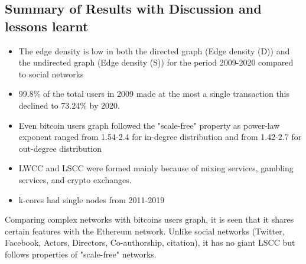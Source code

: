 \documentclass[preprint,12pt]{elsarticle}
\begin{document}
\subsection{Summary of Results with Discussion and lessons learnt}

\begin{itemize}
\item The edge density is low in both the directed graph (Edge density (D)) and the undirected graph (Edge density (S)) for the period 2009-2020 compared to social networks
\item 99.8\% of the total users in 2009 made at the most a single transaction this declined to 73.24\% by 2020.
\item Even bitcoin users graph followed the "scale-free" property as power-law exponent ranged from 1.54-2.4 for in-degree distribution and from 1.42-2.7 for out-degree distribution
\item LWCC and LSCC were formed mainly because of mixing services, gambling services, and crypto exchanges.
\item k-cores had single nodes from 2011-2019
\end{itemize}

Comparing complex networks with bitcoins users graph, it is seen that it shares certain features with the Ethereum network. Unlike social networks (Twitter, Facebook, Actors, Directors, Co-authorship, citation), it has no giant LSCC but follows properties of "scale-free" networks.
\end{document}
